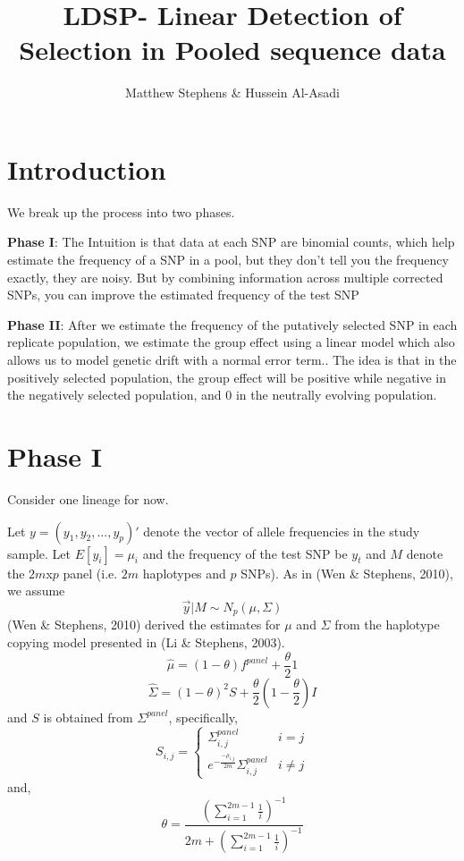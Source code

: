 \documentclass[10pt,a4paper,draft]{article}
\title{LDSP- Linear Detection of Selection in Pooled sequence data}
\date{}
\author{Matthew Stephens \& Hussein Al-Asadi}
\begin{document}
\maketitle
\section{Introduction}
We break up the process into two phases.

\textbf{Phase I}:
The Intuition is that data at each SNP are binomial counts, which help estimate the frequency of a SNP in a pool, but they don't
tell you the frequency exactly, they are noisy. But by combining information across multiple corrected SNPs, you can improve the estimated frequency of the test SNP

\textbf{Phase II}:
After we estimate the frequency of the putatively selected SNP in each replicate population, we estimate the group effect using a linear model which also allows us to model genetic drift with a normal error term.. The idea is that in the positively selected population, the group effect will be positive while negative in the negatively selected population, and 0 in the neutrally evolving population.

\section{Phase I}
Consider one lineage for now.

Let  $y = (y_1, y_2, ..., y_p)'$ denote the vector of allele frequencies in the study sample.
Let $E[y_{i}] = \mu_{i}$ and the frequency of the test SNP be $y_{t}$  and $M$ denote the $2m$x$p$ panel (i.e. $2m$ haplotypes and $p$ SNPs). As in (Wen \& Stephens, 2010), we assume 
\begin{equation}
\vec{y} |M \sim N_p(\mu, \Sigma) \label{eq:prior}
\end{equation}
(Wen \& Stephens, 2010) derived the estimates for $\mu$ and $\Sigma$ from the haplotype copying model presented in (Li \& Stephens, 2003).
\begin{equation}
\hat{\mu} = (1-\theta)f^{panel} + \frac{\theta}{2}1 
\end{equation}
\begin{equation}
\hat{\Sigma} = (1-\theta)^2S + \frac{\theta}{2}(1-\frac{\theta}{2})I
\end{equation}
and $S$ is obtained from $\Sigma^{panel}$, specifically,
 \begin{equation}
   S_{i,j} = \left\{
     \begin{array}{lr}
       \Sigma_{i,j}^{panel} &  i =j\\
       e^{-\frac{-\rho_{i,j}}{2m}} \Sigma_{i,j}^{panel} &  i \neq j
     \end{array}
   \right.
\end{equation} 
and,
\begin{equation}
\theta = \frac{(\sum_{i=1}^{2m-1} \frac{1}{i})^{-1}}{2m + (\sum_{i=1}^{2m-1} \frac{1}{i})^{-1}}
\end{equation}
\end{document}
